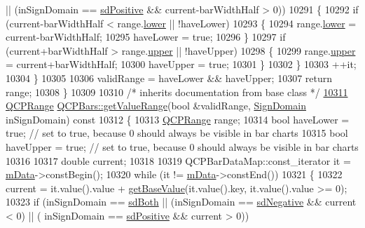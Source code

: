 \begin{DoxyCode}
      || (inSignDomain == \hyperlink{a00024_a661743478a1d3c09d28ec2711d7653d8a02951859f243a4d24e779cfbb5471030}{sdPositive} && current-barWidthHalf > 0))
10291     \{
10292       \textcolor{keywordflow}{if} (current-barWidthHalf < range.\hyperlink{a00049_aa3aca3edb14f7ca0c85d912647b91745}{lower} || !haveLower)
10293       \{
10294         range.\hyperlink{a00049_aa3aca3edb14f7ca0c85d912647b91745}{lower} = current-barWidthHalf;
10295         haveLower = \textcolor{keyword}{true};
10296       \}
10297       \textcolor{keywordflow}{if} (current+barWidthHalf > range.\hyperlink{a00049_ae44eb3aafe1d0e2ed34b499b6d2e074f}{upper} || !haveUpper)
10298       \{
10299         range.\hyperlink{a00049_ae44eb3aafe1d0e2ed34b499b6d2e074f}{upper} = current+barWidthHalf;
10300         haveUpper = \textcolor{keyword}{true};
10301       \}
10302     \}
10303     ++it;
10304   \}
10305   
10306   validRange = haveLower && haveUpper;
10307   \textcolor{keywordflow}{return} range;
10308 \}
10309 
10310 \textcolor{comment}{/* inherits documentation from base class */}
\hypertarget{a00115_source_l10311}{}\hyperlink{a00027_acbcbf97f591d3b8a130b2fdf0a8af74b}{10311} \hyperlink{a00049}{QCPRange} \hyperlink{a00027_acbcbf97f591d3b8a130b2fdf0a8af74b}{QCPBars::getValueRange}(\textcolor{keywordtype}{bool} &validRange, 
      \hyperlink{a00024_a661743478a1d3c09d28ec2711d7653d8}{SignDomain} inSignDomain)\textcolor{keyword}{ const}
10312 \textcolor{keyword}{}\{
10313   \hyperlink{a00049}{QCPRange} range;
10314   \textcolor{keywordtype}{bool} haveLower = \textcolor{keyword}{true}; \textcolor{comment}{// set to true, because 0 should always be visible in bar charts}
10315   \textcolor{keywordtype}{bool} haveUpper = \textcolor{keyword}{true}; \textcolor{comment}{// set to true, because 0 should always be visible in bar charts}
10316   
10317   \textcolor{keywordtype}{double} current;
10318   
10319   QCPBarDataMap::const\_iterator it = \hyperlink{a00027_aef28d29d51ef84b608ecd22c55d531ff}{mData}->constBegin();
10320   \textcolor{keywordflow}{while} (it != \hyperlink{a00027_aef28d29d51ef84b608ecd22c55d531ff}{mData}->constEnd())
10321   \{
10322     current = it.value().value + \hyperlink{a00027_ab60a3c4b8e7c59f0f14e25590d96fa4e}{getBaseValue}(it.value().key, it.value().value >= 0);
10323     \textcolor{keywordflow}{if} (inSignDomain == \hyperlink{a00024_a661743478a1d3c09d28ec2711d7653d8a082b98cfb91a7363a3b5cd17b0c1cd60}{sdBoth} || (inSignDomain == \hyperlink{a00024_a661743478a1d3c09d28ec2711d7653d8a0fc9a70796ef60ad18ddd18056e6dc63}{sdNegative} && current < 0) || (
      inSignDomain == \hyperlink{a00024_a661743478a1d3c09d28ec2711d7653d8a02951859f243a4d24e779cfbb5471030}{sdPositive} && current > 0))

\end{DoxyCode}
